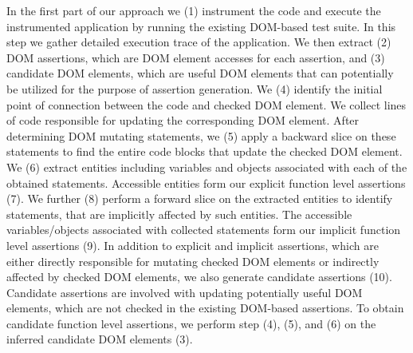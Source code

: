 In the first part of our approach we (1) instrument the \javascript code and execute the instrumented application by running the existing DOM-based test suite. In this step we gather detailed execution trace of the application. We then extract (2) DOM assertions, which are DOM element accesses for each assertion, and (3) candidate DOM elements, which are useful DOM elements that can potentially be utilized for the purpose of assertion generation. We (4) identify the initial point of connection between the \javascript code and checked DOM element. We collect lines of code responsible for updating the corresponding DOM element. After determining DOM mutating statements, we (5) apply a backward slice on these statements to find the entire code blocks that update the checked DOM element. We (6) extract \javascript entities including variables and objects associated with each of the obtained statements. Accessible entities form our explicit function level assertions (7). We further (8) perform a forward slice on the extracted \javascript entities to identify statements, that are implicitly affected by such entities. The accessible \javascript variables/objects associated with collected statements form our implicit function level assertions (9). In addition to explicit and implicit assertions, which are either directly responsible for mutating checked DOM elements or indirectly affected by checked DOM elements, we also generate candidate assertions (10). Candidate assertions are involved with updating potentially useful DOM elements, which are not checked in the existing DOM-based assertions. To obtain candidate function level assertions, we perform step (4), (5), and (6) on the inferred candidate DOM elements (3).

         

